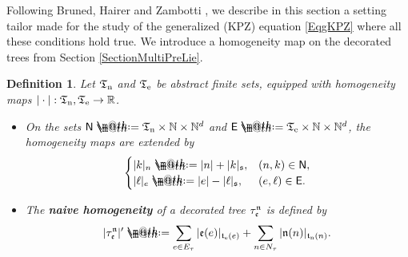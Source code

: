 \documentclass[10pt, reqno]{amsart}
\makeatletter
\numberwithin{subsection}{section}
\numberwithin{subsubsection}{subsection}
\numberwithin{equation}{section} %
\theoremstyle{mystyle}
\theoremstyle{mystyle2}
\newtheorem*{defn*} {Definition}
\theoremstyle{mystyle3}
\newcommand\bbN{\mathbb{N}}
\newcommand\bbR{\mathbb{R}}
\newcommand*{\defeq}{\mathrel{\rlap{%
                     \raisebox{0.3ex}{$\m@th\cdot$}}%
                     \raisebox{-0.3ex}{$\m@th\cdot$}}%
                     =}
\makeatother
\begin{document}
\bigskip

Following Bruned, Hairer and Zambotti \cite{BHZ}, we describe in this section a setting tailor made for the study of the generalized (KPZ) equation \eqref{EqgKPZ} where all these conditions hold true. We introduce a homogeneity map on 
the decorated trees from Section \ref{SectionMultiPreLie}.

\medskip

\begin{defn*}
Let $\frak{T}_{\text{\rm n}}$ and $\frak{T}_{\text{\rm e}}$ be abstract finite sets, equipped with homogeneity maps $|\cdot|:\frak{T}_{\text{\rm n}},\frak{T}_{\text{\rm e}}\to\bbR$. 
\begin{itemize}
\setlength{\itemsep}{0.1cm}
   \item On the sets ${\sf N}\defeq \frak{T}_{\text{\rm n}}\times\bbN\times\bbN^d$ and ${\sf E}\defeq \frak{T}_{\text{\rm e}}\times\bbN\times\bbN^d$, the homogeneity maps are extended by
$$
\begin{cases}
|k|_n \defeq  |n|+|k|_{\frak{s}}, &(n,k)\in{\sf N},   \\
|\ell|_e \defeq  |e|-|\ell|_{\frak{s}}, &(e,\ell)\in{\sf E}.
\end{cases}
$$
   
   \item The \textbf{\textsf{naive homogeneity}} of a decorated tree $\tau_{\frak{e}}^{\frak{n}}$ is defined by
$$
\vert\tau_{\frak{e}}^{\frak{n}}\vert' \defeq  \sum_{e\in E_\tau} \vert\frak{e}(e)\vert_{\frak{t}_{\text{\rm e}}(e)} + \sum_{n\in N_\tau} \vert\frak{n}(n)\vert_{\frak{t}_{\text{\rm n}}(n)}.
$$
\end{itemize}
\end{defn*}   

\medskip
\end{document}
